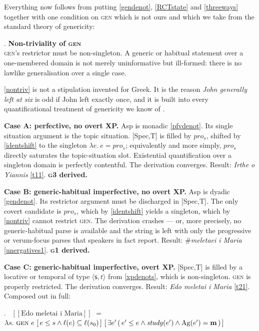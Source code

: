 \documentclass[11pt]{article}
\newcommand{\dbr}[1]{\mbox{ $ [\![ #1 ]\!] $}}
\newcommand{\prs}{\ensuremath{pro_{s}}\xspace}
\newcommand{\sit}{\ensuremath{\mathsf{s}}\xspace}
\newcommand{\ty}[1]{\ensuremath{\langle #1 \rangle}}
\begin{document}
Everything now follows from putting \ref{gendenot}, \ref{RCTstate} and \ref{threeways} together with one condition on \textsc{gen} which is not ours and which we take from the standard theory of genericity:

\ex. \label{nontriv}
\textbf{Non-triviality of \textsc{gen}}\\
\textsc{gen}'s restrictor must be non-singleton.  A generic or habitual statement over a one-membered domain is not merely uninformative but ill-formed: there is no lawlike generalisation over a single case.

\medskip
\ref{nontriv} is not a stipulation invented for Greek.  It is the reason \emph{John generally left at six} is odd if John left exactly once, and it is built into every quantificational treatment of genericity we know of \citep{krifka-etal:1995a, Chierchia:95}.

\medskip\noindent\textbf{Case A: perfective, no overt XP.}  Asp is monadic \ref{pfvdenot}.  Its single situation argument is the topic situation.  [Spec,T] is filled by \prs, shifted by \ref{identshift} to the singleton $\lambda e.\ e = \prs$; equivalently and more simply, \prs{} directly saturates the topic-situation slot.  Existential quantification over a singleton domain is perfectly contentful.  The derivation converges.  Result: \emph{Irthe o Yiannis} \ref{t11}.  \textbf{\textsc{g3} derived.}

\medskip\noindent\textbf{Case B: generic-habitual imperfective, no overt XP.}  Asp is dyadic \ref{gendenot}.  Its restrictor argument must be discharged in [Spec,T].  The only covert candidate is \prs, which by \ref{identshift} yields a singleton, which by \ref{nontriv} cannot restrict \textsc{gen}.  The derivation crashes --- or, more precisely, no generic-habitual parse is available and the string is left with only the progressive or verum-focus parses that speakers in fact report.  Result: \#\emph{meletaei i Maria} \ref{unergatives1}.  \textbf{\textsc{g1} derived.}

\medskip\noindent\textbf{Case C: generic-habitual imperfective, overt XP.}  [Spec,T] is filled by a locative or temporal of type \ty{\sit,t} from \ref{xpdenots}, which is non-singleton.  \textsc{gen} is properly restricted.  The derivation converges.  Result: \emph{Edo meletai i Maria} \ref{t21}.  Composed out in full:

\ex. \label{fullcomp}
\dbr{\text{Edo meletai i Maria}} $=$\\
$\lambda s.\ \textsc{gen}\ e\ [\, e \leq s \wedge \ell(e) \subseteq \ell(s_{0})\,]\ [\, \exists e'\,(\, e' \leq e \wedge \mathit{study}(e') \wedge \mathrm{Ag}(e') = \mathbf{m}\,)\,]$
\end{document}
